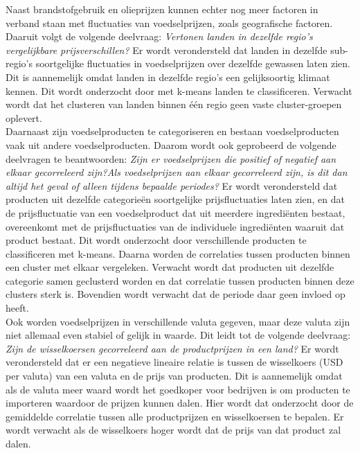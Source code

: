 \documentclass{article}
\begin{document}
Naast brandstofgebruik en olieprijzen kunnen echter nog meer factoren in verband staan met fluctuaties van voedselprijzen, zoals geografische factoren. Daaruit volgt de volgende deelvraag: 
\textit{Vertonen landen in dezelfde regio’s vergelijkbare prijsverschillen?}
Er wordt verondersteld dat landen in dezelfde sub-regio's soortgelijke fluctuaties in voedselprijzen over dezelfde gewassen laten zien. Dit is aannemelijk omdat landen in dezelfde regio's een gelijksoortig klimaat kennen. Dit wordt onderzocht door met k-means landen te classificeren. Verwacht wordt dat het clusteren van landen binnen één regio geen vaste cluster-groepen oplevert.  \\

Daarnaast zijn voedselproducten te categoriseren en bestaan voedselproducten vaak uit andere voedselproducten.
Daarom wordt ook geprobeerd de volgende deelvragen te beantwoorden:
\textit{Zijn er voedselprijzen die positief of negatief aan elkaar gecorreleerd zijn?}\textit{Als voedselprijzen aan elkaar gecorreleerd zijn, is dit dan altijd het geval of alleen tijdens bepaalde periodes?}
Er wordt verondersteld dat producten uit dezelfde categorieën soortgelijke prijsfluctuaties laten zien, en dat de prijsfluctuatie van een voedselproduct dat uit meerdere ingrediënten bestaat, overeenkomt met de prijsfluctuaties van de individuele ingrediënten waaruit dat product bestaat. 
Dit wordt onderzocht door verschillende producten te classificeren met k-means. Daarna worden de correlaties tussen producten binnen een cluster met elkaar vergeleken.
Verwacht wordt dat producten uit dezelfde categorie samen geclusterd worden en dat correlatie tussen producten binnen deze clusters sterk is. Bovendien wordt verwacht dat de periode daar geen invloed op heeft.\\ 
\newpage
Ook worden voedselprijzen in verschillende valuta gegeven, maar deze valuta zijn niet allemaal even stabiel of gelijk in waarde. Dit leidt tot de volgende deelvraag:
\textit{Zijn de wisselkoersen gecorreleerd aan de productprijzen in een land?}
Er wordt verondersteld dat er een negatieve lineaire relatie is tussen de wisselkoers (USD per valuta) van een valuta en de prijs van producten. Dit is aannemelijk omdat als de valuta meer waard wordt het goedkoper voor bedrijven is om producten te importeren waardoor de prijzen kunnen dalen. 
Hier wordt dat onderzocht door de gemiddelde correlatie tussen alle productprijzen en wisselkoersen te bepalen.
Er wordt verwacht als de wisselkoers hoger wordt dat de prijs van dat product zal dalen.\\
\end{document}
